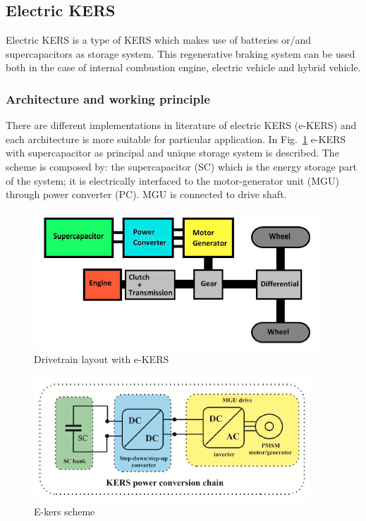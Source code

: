 \documentclass[11pt]{article}
\begin{document}
\subsection{Electric KERS}

Electric KERS is a type of KERS which makes use of batteries or/and supercapacitors as storage system. This regenerative braking system can be used both in the case of internal combustion engine, electric vehicle and hybrid vehicle.

\subsubsection{Architecture and working principle}

There are different implementations in literature of electric KERS (e-KERS) and each architecture is more suitable for particular application. In Fig.~\ref{ekersdrivetrainuc} e-KERS with supercapacitor as principal and unique storage system is described. The scheme is composed by: the supercapacitor (SC) which is the energy storage part of the system; it is electrically interfaced to the motor-generator unit (MGU) through power converter (PC). MGU is connected to drive shaft. 

\begin{figure}[H]
	\centering
	\includegraphics[width=.6\textwidth]{Images/State_of_the_art/Electric_KERS_uconly.PNG}
	\caption{Drivetrain layout with e-KERS}
	\label{ekersdrivetrainuc}
\end{figure}
 
\begin{figure}[H]
	\centering
	\includegraphics[width=.6\textwidth]{Images/State_of_the_art/Electric_KERS_scheme_uconly.PNG}
	\caption{E-kers scheme}
	\label{ekersschemeuc}
\end{figure}
\end{document}
